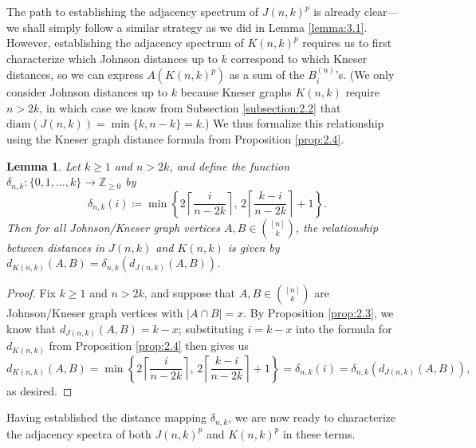 \documentclass{article}
\def\Z{\mathbb{Z}}
\numberwithin{equation}{section}
\theoremstyle{plain}
\newtheorem{lemma}[theorem]{Lemma}
\begin{document}
The path to establishing the adjacency spectrum of $J(n, k)^p$ is already clear---we shall simply follow a similar strategy as we did in Lemma \ref{lemma:3.1}. However, establishing the adjacency spectrum of $K(n, k)^p$ requires us to first characterize which Johnson distances up to $k$ correspond to which Kneser distances, so we can express $A(K(n, k)^p)$ as a sum of the $B_i^{(n)}$'s. (We only consider Johnson distances up to $k$ because Kneser graphs $K(n, k)$ require $n > 2k$, in which case we know from Subsection \ref{subsection:2.2} that $\mathrm{diam}(J(n, k)) = \min\{k, n - k\} = k$.) We thus formalize this relationship using the Kneser graph distance formula from Proposition \ref{prop:2.4}.

\begin{lemma}\label{lemma:4.1}
    Let $k \ge 1$ and $n > 2k$, and define the function $\delta_{n,k} : \{0, 1, \ldots, k\} \to \Z_{\ge 0}$ by
    \[\delta_{n,k}(i) \coloneqq \min\left\{2{\left\lceil\frac{i}{n - 2k}\right\rceil},\, 2{\left\lceil\frac{k - i}{n - 2k}\right\rceil} + 1\right\}.\]
    Then for all Johnson/Kneser graph vertices $A, B \in \binom{[n]}{k}$, the relationship between distances in $J(n, k)$ and $K(n, k)$ is given by $d_{K(n, k)}(A, B) = \delta_{n,k}(d_{J(n, k)}(A, B))$.
\end{lemma}

\begin{proof}
    Fix $k \ge 1$ and $n > 2k$, and suppose that $A, B \in \binom{[n]}{k}$ are Johnson/Kneser graph vertices with $\lvert A \cap B \rvert = x$. By Proposition \ref{prop:2.3}, we know that $d_{J(n, k)}(A, B) = k - x$; substituting $i = k - x$ into the formula for $d_{K(n, k)}$ from Proposition \ref{prop:2.4} then gives us
    \[d_{K(n, k)}(A, B) = \min\left\{2{\left\lceil\frac{i}{n - 2k}\right\rceil},\, 2{\left\lceil\frac{k - i}{n - 2k}\right\rceil} + 1\right\} = \delta_{n,k}(i) = \delta_{n,k}(d_{J(n, k)}(A, B)),\]
    as desired.
\end{proof}

Having established the distance mapping $\delta_{n,k}$, we are now ready to characterize the adjacency spectra of both $J(n, k)^p$ and $K(n, k)^p$ in these terms.
\end{document}
